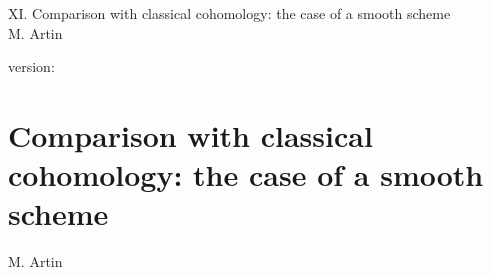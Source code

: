 \documentclass[10pt]{../fichiers-configuration-latex/smfart}
\begin{document}
\begin{center}
XI. Comparison with classical cohomology: the case of a smooth scheme\\
M. Artin
\end{center}

version: \showgitstatus
\tableofcontents

\else
\chapter{Comparison with classical cohomology: the case of a smooth scheme}
\begin{center}
M. Artin
\end{center}
\fi
{}\label{sga4.exp.XI}






\end{document}
